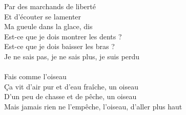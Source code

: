 Par des marchands de liberté\\
Et d'écouter se lamenter\\
Ma gueule dans la glace, dis\\
Est-ce que je dois montrer les dents ?\\
Est-ce que je dois baisser les bras ?\\
Je ne sais pas, je ne sais plus, je suis perdu\\\\
Fais comme l'oiseau\\
Ça vit d'air pur et d'eau fraîche, un oiseau\\
D'un peu de chasse et de pêche, un oiseau\\
Mais jamais rien ne l'empêche, l'oiseau, d'aller plus haut\\\\
